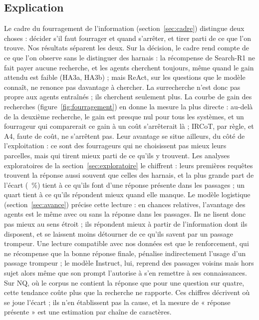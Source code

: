 \subsection{Explication}
Le cadre du fourragement de l'information (section~\ref{sec:cadre}) distingue deux choses : décider s'il faut fourrager et quand s'arrêter, et tirer parti de ce que l'on trouve. Nos résultats séparent les deux. Sur la décision, le cadre rend compte de ce que l'on observe sans le distinguer des harnais : la récompense de Search-R1 ne fait payer aucune recherche, et les agents cherchent toujours, même quand le gain attendu est faible (HA3a, HA3b) ; mais ReAct, sur les questions que le modèle connaît, ne renonce pas davantage à chercher. La surrecherche n'est donc pas propre aux agents entraînés ; ils cherchent seulement plus. La courbe de gain des recherches (figure~\ref{fig:fourragement}) en donne la mesure la plus directe : au-delà de la deuxième recherche, le gain est presque nul pour tous les systèmes, et un fourrageur qui comparerait ce gain à un coût s'arrêterait là ; IRCoT, par règle, et A4, faute de coût, ne s'arrêtent pas. Leur avantage se situe ailleurs, du côté de l'exploitation : ce sont des fourrageurs qui ne choisissent pas mieux leurs parcelles, mais qui tirent mieux parti de ce qu'ils y trouvent. Les analyses exploratoires de la section~\ref{sec:exploratoire} le chiffrent : leurs premières requêtes trouvent la réponse aussi souvent que celles des harnais, et la plus grande part de l'écart (~\%) tient à ce qu'ils font d'une réponse présente dans les passages ; un quart tient à ce qu'ils répondent mieux quand elle manque. Le modèle logistique (section~\ref{sec:avance}) précise cette lecture : en chances relatives, l'avantage des agents est le même avec ou sans la réponse dans les passages. Ils ne lisent donc pas mieux au sens étroit ; ils répondent mieux à partir de l'information dont ils disposent, et se laissent moins détourner de ce qu'ils savent par un passage trompeur. Une lecture compatible avec nos données est que le renforcement, qui ne récompense que la bonne réponse finale, pénalise indirectement l'usage d'un passage trompeur ; le modèle Instruct, lui, reprend des passages voisins mais hors sujet alors même que son prompt l'autorise à s'en remettre à ses connaissances. Sur NQ, où le corpus ne contient la réponse que pour une question sur quatre, cette tendance coûte plus que la recherche ne rapporte. Ces chiffres décrivent où se joue l'écart ; ils n'en établissent pas la cause, et la mesure de « réponse présente » est une estimation par chaîne de caractères.

